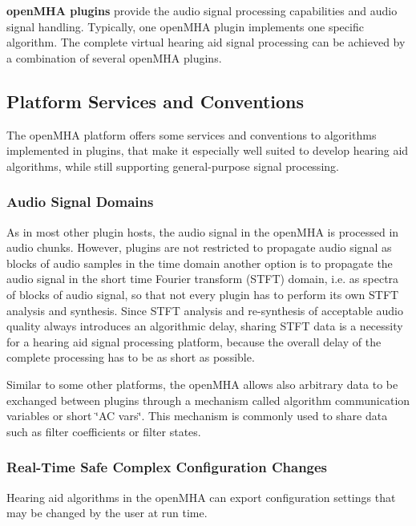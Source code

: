 {\bf openMHA plugins} provide the audio signal processing capabilities and audio signal handling. Typically, one openMHA plugin implements one specific algorithm. The complete virtual hearing aid signal processing can be achieved by a combination of several openMHA plugins.\subsection{Platform Services and Conventions}\label{index_pltf}
The openMHA platform offers some services and conventions to algorithms implemented in plugins, that make it especially well suited to develop hearing aid algorithms, while still supporting general-\/purpose signal processing.\subsubsection{Audio Signal Domains}\label{index_asd}
As in most other plugin hosts, the audio signal in the openMHA is processed in audio chunks. However, plugins are not restricted to propagate audio signal as blocks of audio samples in the time domain another option is to propagate the audio signal in the short time Fourier transform (STFT) domain, i.e. as spectra of blocks of audio signal, so that not every plugin has to perform its own STFT analysis and synthesis. Since STFT analysis and re-\/synthesis of acceptable audio quality always introduces an algorithmic delay, sharing STFT data is a necessity for a hearing aid signal processing platform, because the overall delay of the complete processing has to be as short as possible.

Similar to some other platforms, the openMHA allows also arbitrary data to be exchanged between plugins through a mechanism called algorithm communication variables or short \char`\"{}AC vars\char`\"{}. This mechanism is commonly used to share data such as filter coefficients or filter states.\subsubsection{Real-\/Time Safe Complex Configuration Changes}\label{index_rtscc}
Hearing aid algorithms in the openMHA can export configuration settings that may be changed by the user at run time.

